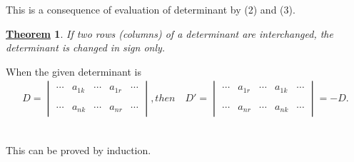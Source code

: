 \documentclass[11pt]{amsbook}
\newtheorem*{theorem}{\underline{Theorem}}
\begin{document}
\par This is a consequence of evaluation of determinant by (2) and (3).\\
\begin{theorem}
If two rows (columns) of a determinant are interchanged, the determinant is changed in sign only.\\
\end{theorem}
\par When the given determinant is\\
\begin{align*}
D=
\begin{vmatrix}
 \cdots & a_{1k} & \cdots & a_{1r} & \cdots \\\\\\
 \cdots & a_{nk} & \cdots & a_{nr} & \cdots 
\end{vmatrix}
,then\quad D'=
\begin{vmatrix}
 \cdots & a_{1r} & \cdots & a_{1k} & \cdots \\\\\\
 \cdots & a_{nr} & \cdots & a_{nk} & \cdots
\end{vmatrix}
 = -D.
\end{align*}\\
\par This can be proved by induction.
\end{document}
